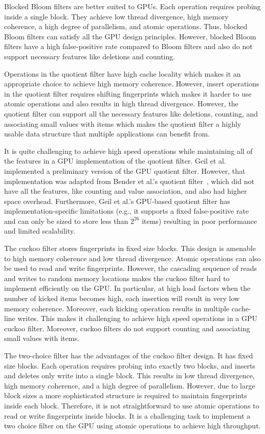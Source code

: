 Blocked Bloom filters are better suited to GPUs.  Each operation requires
probing inside a single block. They achieve low thread divergence, high memory
coherence, a high degree of parallelism, and atomic operations. Thus, blocked
Bloom filters can satisfy all the GPU design principles. However, blocked Bloom
filters have a high false-positive rate compared to Bloom filters and also do
not support necessary features like deletions and counting.

Operations in the quotient filter have high cache locality which makes it an
appropriate choice to achieve high memory coherence. However, insert operations
in the quotient filter requires shifting fingerprints which makes it harder to
use atomic operations and also results in high thread divergence. However, the
quotient filter can support all the necessary features like deletions, counting,
and associating small values with items which makes the quotient filter a highly
usable data structure that multiple applications can benefit from.

It is quite challenging to achieve high speed operations while maintaining all
of the features in a GPU implementation of the quotient filter. Geil et
al.~\cite{Geil:2018:QFA} implemented a preliminary version of the GPU quotient filter.
However, that implementation was adapted from Bender et al.'s quotient
filter~\cite{BenderFaJo12a}, which did not have all the features, like counting
and value association, and also had higher space overhead. Furthermore, Geil et
al.'s GPU-based quotient filter has implementation-specific limitations (e.g., it
supports a fixed false-positive rate and can only be sized to store less than
$2^{26}$ items) resulting in poor performance and limited scalability.

The cuckoo filter stores fingerprints in fixed size blocks. This design is
amenable to high memory coherence and low thread divergence. Atomic operations
can also be used to read and write fingerprints. However, the cascading sequence
of reads and writes to random memory locations makes the cuckoo filter hard to
implement efficiently on the GPU\@. In particular, at high load factors when the
number of kicked items becomes high, each insertion will result in very low
memory coherence. Moreover, each kicking operation results in multiple
cache-line writes. This makes it challenging to achieve high speed operations in
a GPU cuckoo filter. Moreover, cuckoo filters do not support counting and
associating small values with items.

The two-choice filter has the advantages of the cuckoo filter design. It has
fixed size blocks. Each operation requires probing into exactly two blocks, and
inserts and deletes only write into a single block. This results in low thread
divergence, high memory coherence, and a high degree of parallelism. However,
due to large block sizes a more sophisticated structure is required to maintain
fingerprints inside each block. Therefore, it is not straightforward to use
atomic operations to read or write fingerprints inside blocks. It is a
challenging task to implement a two choice filter on the GPU using atomic
operations to achieve high throughput.

